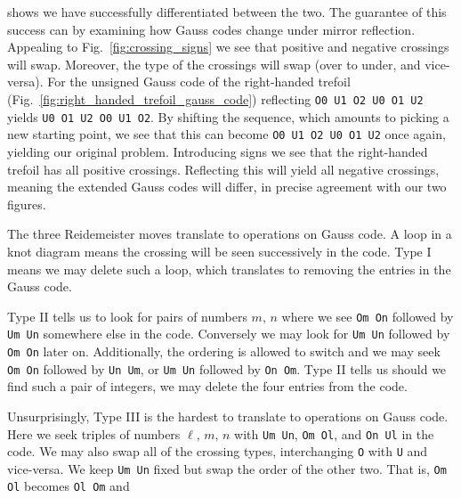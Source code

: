         shows we have successfully differentiated between the two. The
        guarantee of this success can by examining how Gauss codes change
        under mirror reflection. Appealing to
        Fig.~\ref{fig:crossing_signs} we see that positive and negative
        crossings will swap. Moreover, the type of the crossings will swap
        (over to under, and vice-versa). For the unsigned Gauss code of the
        right-handed trefoil (Fig.~\ref{fig:right_handed_trefoil_gauss_code})
        reflecting \texttt{O0 U1 O2 U0 O1 U2} yields
        \texttt{U0 O1 U2 O0 U1 O2}. By shifting the sequence, which amounts
        to picking a new starting point, we see that this can become
        \texttt{O0 U1 O2 U0 O1 U2} once again, yielding our original problem.
        Introducing signs we see that the right-handed trefoil has all
        positive crossings. Reflecting this will yield all negative crossings,
        meaning the extended Gauss codes will differ, in precise agreement
        with our two figures.
        \par\hfill\par
        The three Reidemeister moves translate to operations on Gauss code.
        A loop in a knot diagram means the crossing will be seen successively
        in the code. Type I means we may delete such a loop, which translates
        to removing the entries in the Gauss code.
        \par\hfill\par
        Type II tells us to look for pairs of numbers $m,\,n$ where we see
        \texttt{Om On} followed by \texttt{Um Un} somewhere else in the code.
        Conversely we may look for \texttt{Um Un} followed by \texttt{Om On}
        later on. Additionally, the ordering is allowed to switch and we may
        seek \texttt{Om On} followed by \texttt{Un Um}, or
        \texttt{Um Un} followed by \texttt{On Om}. Type II tells us should we
        find such a pair of integers, we may delete the four entries from the
        code.
        \par\hfill\par
        Unsurprisingly, Type III is the hardest to translate to operations on
        Gauss code. Here we seek triples of numbers
        $\ell,\,m,\,n$ with \texttt{Um Un}, \texttt{Om Ol},
        and \texttt{On Ul} in the code. We may also swap all of the crossing
        types, interchanging \texttt{O} with \texttt{U} and vice-versa.
        We keep \texttt{Um Un} fixed but swap the order of the other two.
        That is, \texttt{Om Ol} becomes \texttt{Ol Om} and
